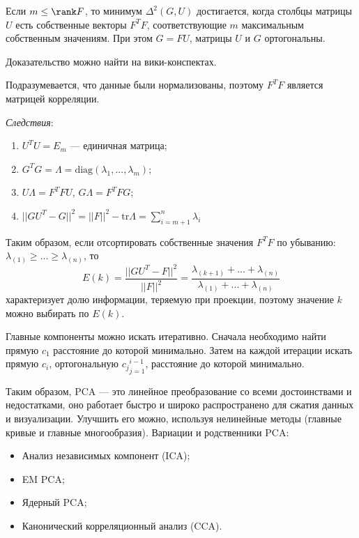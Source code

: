 \begin{theorem}
    Если $m\leq\rank F$, то минимум $\Delta^2(G,U)$ достигается, когда столбцы матрицы $U$ есть собственные векторы $F^TF$, соответствующие $m$ максимальным собственным значениям. При этом $G=FU$, матрицы $U$ и $G$ ортогональны.
\end{theorem}

\begin{remark}
    Доказательство можно найти на вики-конспектах.
\end{remark}

\begin{remark}
    Подразумевается, что данные были нормализованы, поэтому $F^TF$ является матрицей корреляции.
\end{remark}

\textit{Следствия}:
\begin{enumerate}
    \item $U^TU=E_m$ --- единичная матрица;
    \item $G^TG=\Lambda=\mathrm{diag}(\lambda_1,...,\lambda_m)$;
    \item $U\Lambda=F^TFU$, $G\Lambda=F^TFG$;
    \item $||GU^T-G||^2=||F||^2 - \mathrm{tr}\Lambda=\sum_{i=m+1}^n\lambda_i$
\end{enumerate}

Таким образом, если отсортировать собственные значения $F^TF$ по убыванию: $\lambda_{(1)}\geq...\geq\lambda_{(n)}$, то
\[
    E(k)=\dfrac{||GU^T-F||^2}{||F||^2}=\dfrac{\lambda_{(k+1)}+...+\lambda_{(n)}}{\lambda_{(1)}+...+\lambda_{(n)}}
\]
характеризует долю информации, теряемую при проекции, поэтому значение $k$ можно выбирать по $E(k)$.

\begin{remark}
    Главные компоненты можно искать итеративно. Сначала необходимо найти прямую $c_1$ расстояние до которой минимально. Затем на каждой итерации искать прямую $c_i$, ортогональную ${c_j}_{j=1}^{i-1}$, расстояние до которой минимально.
\end{remark}

Таким образом, PCA --- это линейное преобразование со всеми достоинствами и недостатками, оно работает быстро и широко распространено для сжатия данных и визуализации. Улучшить его можно, используя нелинейные методы (главные кривые и главные многообразия).\newline
Вариации и родственники PCA:
\begin{itemize}
    \item Анализ независимых компонент (ICA);
    \item EM PCA;
    \item Ядерный PCA;
    \item Канонический корреляционный анализ (CCA).
\end{itemize}


